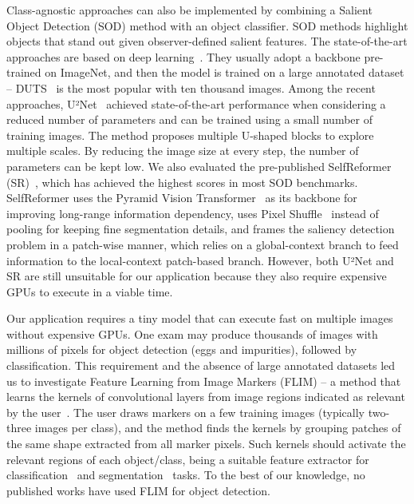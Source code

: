 \documentclass[times,twocolumn,final,authoryear]{elsarticle}
\begin{document}
   Class-agnostic approaches can also be implemented by combining a Salient Object Detection (SOD) method with an object classifier. SOD methods highlight objects that stand out given observer-defined salient features. The state-of-the-art approaches are based on deep learning~\cite{wang2021salient}. They usually adopt a backbone pre-trained on ImageNet, and then the model is trained on a large annotated dataset -- DUTS~\cite{wang2017learning} is the most popular with ten thousand images. Among the recent approaches, U²Net~\cite{qin2020u2} achieved state-of-the-art performance when considering a reduced number of parameters and can be trained using a small number of training images. The method proposes multiple U-shaped blocks to explore multiple scales. By reducing the image size at every step, the number of parameters can be kept low. We also evaluated the pre-published SelfReformer (SR)~\cite{yun2022selfreformer}, which has achieved the highest scores in most SOD benchmarks. SelfReformer uses the Pyramid Vision Transformer~\cite{wang2021pyramid} as its backbone for improving long-range information dependency, uses Pixel Shuffle~\cite{shi2016real} instead of pooling for keeping fine segmentation details, and frames the saliency detection problem in a patch-wise manner, which relies on a global-context branch to feed information to the local-context patch-based branch. However, both U²Net and SR are still unsuitable for our application because they also require expensive GPUs to execute in a viable time.
   
Our application requires a tiny model that can execute fast on multiple images without expensive GPUs. One exam may produce thousands of images with millions of pixels for object detection (eggs and impurities), followed by classification. This requirement and the absence of large annotated datasets led us to investigate Feature Learning from Image Markers (FLIM) -- a method that learns the kernels of convolutional layers from image regions indicated as relevant by the user~\cite{de2020feature}. The user draws markers on a few training images (typically two-three images per class), and the method finds the kernels by grouping patches of the same shape extracted from all marker pixels. Such kernels should activate the relevant regions of each object/class, being a suitable feature extractor for classification~\cite{de2020learning, sousa2021cnn} and segmentation~\cite{de2020feature} tasks. To the best of our knowledge, no published works have used FLIM for object detection.
\end{document}
